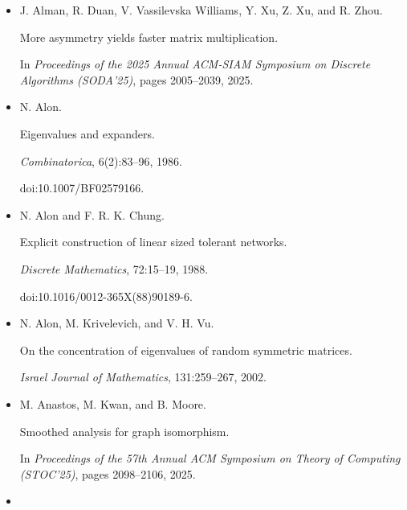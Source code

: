 \begin{itemize}


\item[] 
[1]

J. Alman, R. Duan, V. Vassilevska Williams, Y. Xu, Z. Xu, and R. Zhou.


More asymmetry yields faster matrix multiplication.


In \emph{Proceedings of the 2025 Annual ACM-SIAM Symposium on Discrete
Algorithms (SODA’25)}, pages 2005–2039, 2025.





\item[] 
[2]

N. Alon.


Eigenvalues and expanders.


\emph{Combinatorica}, 6(2):83–96, 1986.


doi:10.1007/BF02579166.





\item[] 
[3]

N. Alon and F. R. K. Chung.


Explicit construction of linear sized tolerant networks.


\emph{Discrete Mathematics}, 72:15–19, 1988.


doi:10.1016/0012-365X(88)90189-6.





\item[] 
[4]

N. Alon, M. Krivelevich, and V. H. Vu.


On the concentration of eigenvalues of random symmetric matrices.


\emph{Israel Journal of Mathematics}, 131:259–267, 2002.





\item[] 
[5]

M. Anastos, M. Kwan, and B. Moore.


Smoothed analysis for graph isomorphism.


In \emph{Proceedings of the 57th Annual ACM Symposium on Theory of
Computing (STOC’25)}, pages 2098–2106, 2025.





\item[] 
[6]


\end{itemize}
